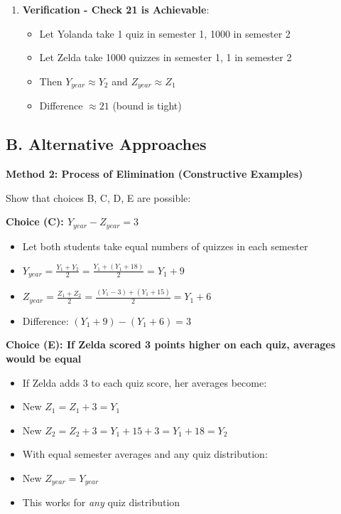 \documentclass[12pt]{article}
\begin{document}
\begin{solutionbox}
\begin{enumerate}[leftmargin=*]
    \item \textbf{Verification - Check 21 is Achievable}:
    \begin{itemize}
        \item Let Yolanda take 1 quiz in semester 1, 1000 in semester 2
        \item Let Zelda take 1000 quizzes in semester 1, 1 in semester 2
        \item Then $Y_{year} \approx Y_2$ and $Z_{year} \approx Z_1$
        \item Difference $\approx 21$ \checkmark (bound is tight)
    \end{itemize}
\end{enumerate}

\subsection*{B. Alternative Approaches}

\textbf{Method 2: Process of Elimination (Constructive Examples)}

Show that choices B, C, D, E are possible:

\textbf{Choice (C): $Y_{year} - Z_{year} = 3$}
\begin{itemize}
    \item Let both students take equal numbers of quizzes in each semester
    \item $Y_{year} = \frac{Y_1 + Y_2}{2} = \frac{Y_1 + (Y_1 + 18)}{2} = Y_1 + 9$
    \item $Z_{year} = \frac{Z_1 + Z_2}{2} = \frac{(Y_1-3) + (Y_1+15)}{2} = Y_1 + 6$
    \item Difference: $(Y_1 + 9) - (Y_1 + 6) = 3$ \checkmark
\end{itemize}

\textbf{Choice (E): If Zelda scored 3 points higher on each quiz, averages would be equal}
\begin{itemize}
    \item If Zelda adds 3 to each quiz score, her averages become:
    \item New $Z_1 = Z_1 + 3 = Y_1$
    \item New $Z_2 = Z_2 + 3 = Y_1 + 15 + 3 = Y_1 + 18 = Y_2$
    \item With equal semester averages and any quiz distribution:
    \item New $Z_{year} = Y_{year}$ \checkmark
    \item This works for \textit{any} quiz distribution
\end{itemize}


\end{solutionbox}
\end{document}
